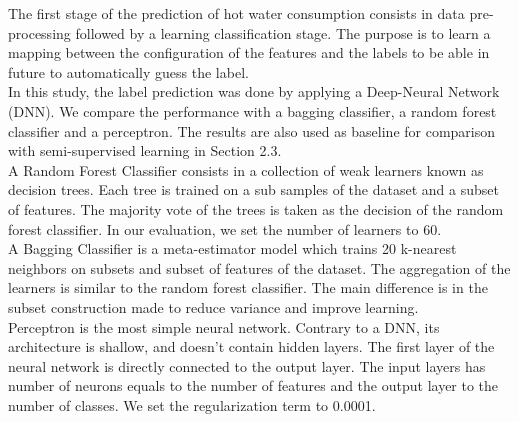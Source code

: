 \documentclass{llncs}
\begin{document}
The first stage of the prediction of hot water consumption consists in data pre-processing followed by a learning classification stage. The purpose is to learn a mapping between the configuration of the features and the labels to be able in future to automatically guess the label.
\\In this study, the label prediction was done by applying a Deep-Neural Network (DNN). We compare the performance with a bagging classifier, a random forest classifier and a perceptron.
The results are also used as baseline for comparison with semi-supervised learning in Section 2.3. 
\\A Random Forest Classifier consists in a collection of weak learners known as decision trees. Each tree is trained on a sub samples of the dataset and a subset of features. The majority vote of the trees is taken as the decision of the random forest classifier. In our evaluation, we set the number of learners to 60.
\\A Bagging Classifier is a meta-estimator model which trains 20 k-nearest neighbors on subsets and subset of features of the dataset. The aggregation of the learners is similar to the random forest classifier. The main difference is in the subset construction made to reduce variance and improve learning. 
\\ Perceptron is the most simple neural network. Contrary to a DNN, its architecture is shallow, and doesn't contain hidden layers. The first layer of the neural network is directly connected to the output layer. The input layers has number of neurons equals to the number of features and the output layer to the number of classes. We set the regularization term to 0.0001.
\end{document}

